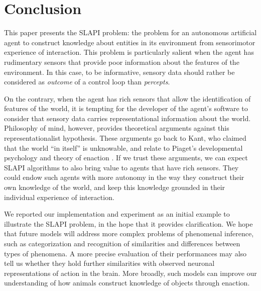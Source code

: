 \documentclass[pmlr]{jmlr}%
\begin{document}
\section{Conclusion}

This paper presents the SLAPI problem: the problem for an autonomous artificial agent to construct knowledge about entities in its environment from sensorimotor experience of interaction.  
This problem is particularly salient when the agent has rudimentary sensors that provide poor information about the features of the environment. 
In this case, to be informative, sensory data should rather be considered as \textit{outcome} of a control loop than \textit{percepts}.

On the contrary, when the agent has rich sensors that allow the identification of features of the world, it is tempting for the developer of the agent's software to consider that sensory data carries representational information about the world. 
Philosophy of mind, however, provides theoretical arguments against this representationalist hypothesis. 
These arguments go back to Kant, who claimed that the world ``in itself'' is unknowable, and relate to Piaget's developmental psychology and theory of enaction \citep[e.g.,][]{froese_enactive_2009}. 
If we trust these arguments, we can expect SLAPI algorithms to also bring value to agents that have rich sensors. 
They could endow such agents with more autonomy in the way they construct their own knowledge of the world, and keep this knowledge grounded in their individual experience of interaction.

We reported our implementation and experiment as an initial example to illustrate the SLAPI problem, in the hope that it provides clarification. 
We hope that future models will address more complex problems of phenomenal inference, such as categorization and recognition of similarities and differences between types of phenomena. 
A more precise evaluation of their performances may also tell us whether they hold further similarities with observed neuronal representations of action in the brain. 
More broadly, such models can improve our understanding of how animals construct knowledge of objects through enaction. 




\end{document}
